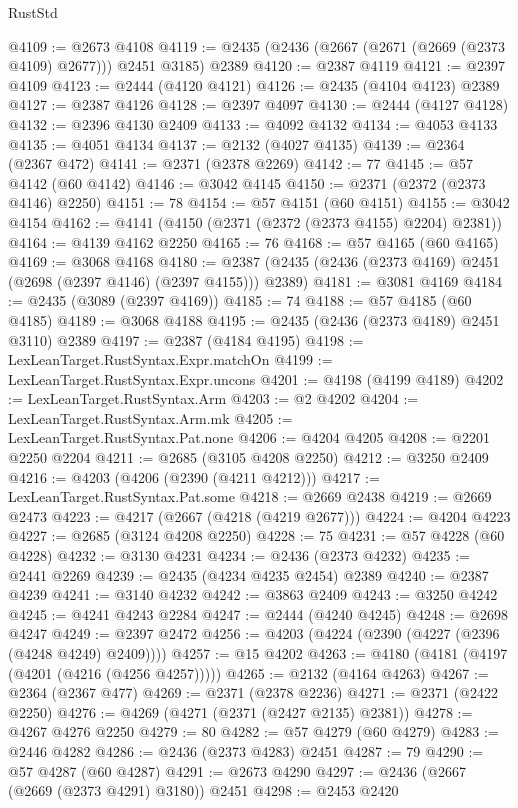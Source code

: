 \begin{lexlean}{RustStd}
\begin{coremodule}
@4109 := @2673 @4108
@4119 := @2435 (@2436 (@2667 (@2671 (@2669 (@2373 @4109) @2677))) @2451 @3185) @2389
@4120 := @2387 @4119
@4121 := @2397 @4109
@4123 := @2444 (@4120 @4121)
@4126 := @2435 (@4104 @4123) @2389
@4127 := @2387 @4126
@4128 := @2397 @4097
@4130 := @2444 (@4127 @4128)
@4132 := @2396 @4130 @2409
@4133 := @4092 @4132
@4134 := @4053 @4133
@4135 := @4051 @4134
@4137 := @2132 (@4027 @4135)
@4139 := @2364 (@2367 @472)
@4141 := @2371 (@2378 @2269)
@4142 := 77
@4145 := @57 @4142 (@60 @4142)
@4146 := @3042 @4145
@4150 := @2371 (@2372 (@2373 @4146) @2250)
@4151 := 78
@4154 := @57 @4151 (@60 @4151)
@4155 := @3042 @4154
@4162 := @4141 (@4150 (@2371 (@2372 (@2373 @4155) @2204) @2381))
@4164 := @4139 @4162 @2250
@4165 := 76
@4168 := @57 @4165 (@60 @4165)
@4169 := @3068 @4168
@4180 := @2387 (@2435 (@2436 (@2373 @4169) @2451 (@2698 (@2397 @4146) (@2397 @4155))) @2389)
@4181 := @3081 @4169
@4184 := @2435 (@3089 (@2397 @4169))
@4185 := 74
@4188 := @57 @4185 (@60 @4185)
@4189 := @3068 @4188
@4195 := @2435 (@2436 (@2373 @4189) @2451 @3110) @2389
@4197 := @2387 (@4184 @4195)
@4198 := LexLeanTarget.RustSyntax.Expr.matchOn
@4199 := LexLeanTarget.RustSyntax.Expr.uncons
@4201 := @4198 (@4199 @4189)
@4202 := LexLeanTarget.RustSyntax.Arm
@4203 := @2 @4202
@4204 := LexLeanTarget.RustSyntax.Arm.mk
@4205 := LexLeanTarget.RustSyntax.Pat.none
@4206 := @4204 @4205
@4208 := @2201 @2250 @2204
@4211 := @2685 (@3105 @4208 @2250)
@4212 := @3250 @2409
@4216 := @4203 (@4206 (@2390 (@4211 @4212)))
@4217 := LexLeanTarget.RustSyntax.Pat.some
@4218 := @2669 @2438
@4219 := @2669 @2473
@4223 := @4217 (@2667 (@4218 (@4219 @2677)))
@4224 := @4204 @4223
@4227 := @2685 (@3124 @4208 @2250)
@4228 := 75
@4231 := @57 @4228 (@60 @4228)
@4232 := @3130 @4231
@4234 := @2436 (@2373 @4232)
@4235 := @2441 @2269
@4239 := @2435 (@4234 @4235 @2454) @2389
@4240 := @2387 @4239
@4241 := @3140 @4232
@4242 := @3863 @2409
@4243 := @3250 @4242
@4245 := @4241 @4243 @2284
@4247 := @2444 (@4240 @4245)
@4248 := @2698 @4247
@4249 := @2397 @2472
@4256 := @4203 (@4224 (@2390 (@4227 (@2396 (@4248 @4249) @2409))))
@4257 := @15 @4202
@4263 := @4180 (@4181 (@4197 (@4201 (@4216 (@4256 @4257)))))
@4265 := @2132 (@4164 @4263)
@4267 := @2364 (@2367 @477)
@4269 := @2371 (@2378 @2236)
@4271 := @2371 (@2422 @2250)
@4276 := @4269 (@4271 (@2371 (@2427 @2135) @2381))
@4278 := @4267 @4276 @2250
@4279 := 80
@4282 := @57 @4279 (@60 @4279)
@4283 := @2446 @4282
@4286 := @2436 (@2373 @4283) @2451
@4287 := 79
@4290 := @57 @4287 (@60 @4287)
@4291 := @2673 @4290
@4297 := @2436 (@2667 (@2669 (@2373 @4291) @3180)) @2451
@4298 := @2453 @2420

\end{coremodule}
\end{lexlean}
